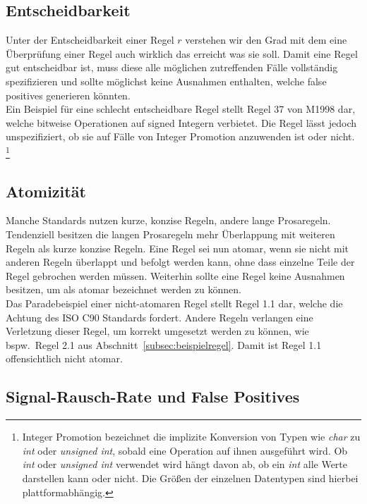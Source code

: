 \documentclass[a4paper,UKenglish,cleveref, autoref]{templates/lipics-v2019}
\begin{document}
    \subsection{Entscheidbarkeit}
    \label{subsec:entscheidbarkeit}
    Unter der Entscheidbarkeit einer Regel $r$ verstehen wir den Grad mit dem eine Überprüfung einer Regel auch wirklich das
    erreicht was sie soll.
    Damit eine Regel gut entscheidbar ist, muss diese alle möglichen zutreffenden Fälle vollständig spezifizieren und
    sollte möglichst keine Ausnahmen enthalten, welche false positives generieren könnten.\\
    Ein Beispiel für eine schlecht entscheidbare Regel stellt Regel 37 von M1998 dar, welche bitweise Operationen auf
    signed Integern verbietet.
    Die Regel lässt jedoch unspezifiziert, ob sie auf Fälle von Integer Promotion anzuwenden ist oder nicht.
    \footnote{Integer Promotion bezeichnet die implizite Konversion von Typen wie \textit{char} zu \textit{int} oder \textit{unsigned int}, sobald eine Operation auf ihnen ausgeführt wird.
    Ob \textit{int} oder \textit{unsigned int} verwendet wird hängt davon ab, ob ein \textit{int} alle Werte darstellen
    kann oder nicht.
    Die Größen der einzelnen Datentypen sind hierbei plattformabhängig.}

    \subsection{Atomizität}
    \label{subsec:atomizität}
    Manche Standards nutzen kurze, konzise Regeln, andere lange Prosaregeln.
    Tendenziell besitzen die langen Prosaregeln mehr Überlappung mit weiteren Regeln als kurze konzise Regeln.
    Eine Regel sei nun atomar, wenn sie nicht mit anderen Regeln überlappt und befolgt werden kann, ohne dass einzelne
    Teile der Regel gebrochen werden müssen.
    Weiterhin sollte eine Regel keine Ausnahmen besitzen, um als atomar bezeichnet werden zu können.\\
    Das Paradebeispiel einer nicht-atomaren Regel stellt Regel 1.1 dar, welche die Achtung des ISO C90 Standards fordert.
    Andere Regeln verlangen eine Verletzung dieser Regel, um korrekt umgesetzt werden zu können, wie bspw.\ Regel 2.1
    aus Abschnitt~\ref{subsec:beispielregel}.
    Damit ist Regel 1.1 offensichtlich nicht atomar.

    \subsection{Signal-Rausch-Rate und False Positives}
    \label{subsec:signal-rausch-rate-und-false-positives}
\end{document}
